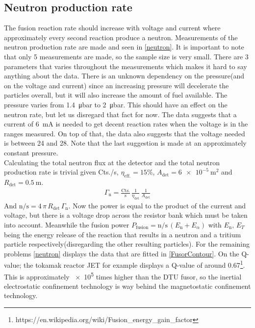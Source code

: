 \subsection{Neutron production rate}
The fusion reaction rate should increase with voltage and current where approximately every second reaction produce a neutron. Measurements of the neutron production rate are made and seen in \cref{neutron}. It is important to note that only 5 measurements are made, so the sample size is very small. There are 3 parameters that varies throughout the measurements which makes it hard to say anything about the data. There is an unknown dependency on the pressure(and on the voltage and current) since an increasing pressure will decelerate the particles overall, but it will also increase the amount of fuel available. The pressure varies from \SI{1.4}{\micro\bar} to \SI{2}{\micro\bar}. This should have an effect on the neutron rate, but let us disregard that fact for now. The data suggests that a current of \SI{6}{\milli\ampere} is needed to get decent reaction rates when the voltage is in the ranges measured. On top of that, the data also suggests that the voltage needed is between \SI{24}{\volts} and \SI{28}{\volts}. Note that the last suggestion is made at an approximately constant pressure.\\
Calculating the total neutron flux at the detector and the total neutron production rate is trivial given Cts./s,  \(\eta_{\mathrm{eff.}}=15\%\), \(A_{\mathrm{det}}=\SI{6e-5}{\meter\squared}\) and \(R_{\mathrm{det}}=\SI{0.5}{\meter}\).
\begin{align}
	\Gamma_{\mathrm{n}}=\frac{\mathrm{Cts.}}{\mathrm{s}}\,\frac{1}{\eta_{\mathrm{det}}}\,\frac{1}{A_{\mathrm{det}}}
\end{align}
And \(\mathrm{n}/\mathrm{s}=4\,\pi\, R_{\mathrm{det}}\,\Gamma_{\mathrm{n}}\). Now the power is equal to the product of the current and voltage, but there is a voltage drop across the resistor bank which must be taken into account. Meanwhile the fusion power \(P_{\mathrm{fusion}}=\mathrm{n}/\mathrm{s}\, (E_{\mathrm{n}}+E_{\alpha})\) with \(E_{\mathrm{n}},\,E_{T}\) being the energy release of the reaction that results in a neutron and a tritium particle respectively(disregarding the other resulting particles). For the remaining problems \cref{neutron} displays the data that are fitted in \cref{FusorContour}. On the Q-value; the tokamak reactor JET for example displays a Q-value of around 0.67\footnote{https://en.wikipedia.org/wiki/Fusion_energy_gain_factor}. This is approximately \SI{e5}{} times higher than the DTU fusor, so the inertial electrostatic confinement technology is way behind the magnetostatic confinement technology. \\
